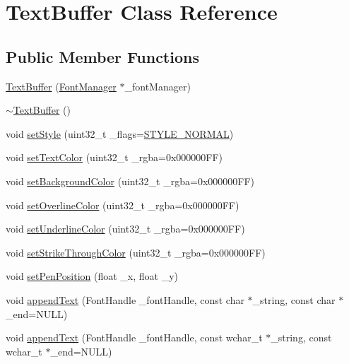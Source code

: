 \hypertarget{class_text_buffer}{\section{Text\+Buffer Class Reference}
\label{class_text_buffer}
}
\subsection*{Public Member Functions}
\begin{DoxyCompactItemize}
\item 
\hyperlink{class_text_buffer_a8007ebfe26e61f881faf2bdf2684d2e8}{Text\+Buffer} (\hyperlink{class_font_manager}{Font\+Manager} $\ast$\+\_\+font\+Manager)
\item 
\hyperlink{class_text_buffer_ae6e62ee499ddea775d45fdf16ecebe06}{$\sim$\+Text\+Buffer} ()
\item 
void \hyperlink{class_text_buffer_a13356bfcc3acb9e86287f65d8e3276f0}{set\+Style} (uint32\+\_\+t \+\_\+flags=\hyperlink{text__buffer__manager_8h_a41440449340237d5eb6b0c4f7357bd35ac828230a58c9428e9da9cf9e5f440813}{S\+T\+Y\+L\+E\+\_\+\+N\+O\+R\+M\+A\+L})
\item 
void \hyperlink{class_text_buffer_ae7823a0daf4a4aece545daf300a57722}{set\+Text\+Color} (uint32\+\_\+t \+\_\+rgba=0x000000\+F\+F)
\item 
void \hyperlink{class_text_buffer_aaca48470033fe223673cd061c5c411bd}{set\+Background\+Color} (uint32\+\_\+t \+\_\+rgba=0x000000\+F\+F)
\item 
void \hyperlink{class_text_buffer_a2b50d0fa59a6f30ed2d238621f1f92ee}{set\+Overline\+Color} (uint32\+\_\+t \+\_\+rgba=0x000000\+F\+F)
\item 
void \hyperlink{class_text_buffer_ae3778e7512b9c64bf23a3df6178f93f6}{set\+Underline\+Color} (uint32\+\_\+t \+\_\+rgba=0x000000\+F\+F)
\item 
void \hyperlink{class_text_buffer_aaa981ea6b1152022877d2973a53f63c3}{set\+Strike\+Through\+Color} (uint32\+\_\+t \+\_\+rgba=0x000000\+F\+F)
\item 
void \hyperlink{class_text_buffer_af240416b25614c190fb18c52684f2767}{set\+Pen\+Position} (float \+\_\+x, float \+\_\+y)
\item 
void \hyperlink{class_text_buffer_adee33c747df6394a4eb2f67a7061e6f9}{append\+Text} (Font\+Handle \+\_\+font\+Handle, const char $\ast$\+\_\+string, const char $\ast$\+\_\+end=N\+U\+L\+L)
\item 
void \hyperlink{class_text_buffer_a2111469faa046a6e198ba825cc623fc6}{append\+Text} (Font\+Handle \+\_\+font\+Handle, const wchar\+\_\+t $\ast$\+\_\+string, const wchar\+\_\+t $\ast$\+\_\+end=N\+U\+L\+L)

\end{DoxyCompactItemize}
